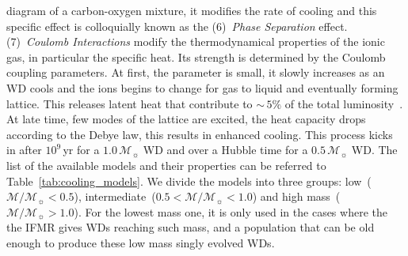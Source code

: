 \documentclass[fleqn,usenatbib]{rasti}
\newcommand{\msun}{\mathcal{M}_{\sun}}
\begin{document}
diagram of a carbon-oxygen mixture, it modifies the rate of cooling and this
specific effect is colloquially known as the (6)~\textit{Phase Separation}
effect. (7)~\textit{Coulomb Interactions} modify the thermodynamical
properties of the ionic gas, in particular the specific heat. Its strength is
determined by the Coulomb coupling parameters. At first, the parameter is
small, it slowly increases as an WD cools and the ions begins to change for
gas to liquid and eventually forming lattice. This releases latent heat that
contribute to $\sim$\,$5\%$ of the total luminosity~\citep{1976A&A....51..383S}.
At late time, few modes of the lattice are excited, the heat capacity drops
according to the Debye law, this results in enhanced cooling. This process
kicks in after $10^9$\,yr for a $1.0\,\msun$ WD and over a Hubble time for a
$0.5\,\msun$ WD. The list of the available models and their properties can be
referred to Table~\ref{tab:cooling_models}. We divide the models into three
groups: low~($\mathcal{M}/\msun < 0.5$),
intermediate~($0.5 < \mathcal{M}/\msun < 1.0$) and
high mass~($\mathcal{M}/\msun > 1.0$). For the lowest mass one, it is only
used in the cases where the the IFMR gives WDs reaching such mass, and a
population that can be old enough to produce these low mass singly evolved
WDs.
\end{document}
